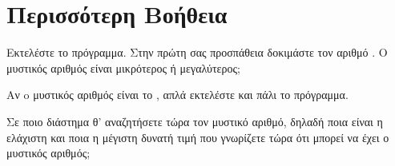 \documentclass[a4paper,11pt,oneside]{book}
\begin{document}
\section{Περισσότερη Βοήθεια}

\begin{step}
Εκτελέστε το πρόγραμμα. Στην πρώτη σας προσπάθεια δοκιμάστε τον αριθμό . Ο μυστικός αριθμός είναι μικρότερος ή μεγαλύτερος;

\begin{note}
Αν o μυστικός αριθμός είναι το , απλά εκτελέστε και πάλι το πρόγραμμα.
\end{note}

\marginnote[14pt]{\icondiscuss}
\dottedline

Σε ποιο διάστημα θ' αναζητήσετε τώρα τον μυστικό αριθμό, δηλαδή 
ποια είναι η ελάχιστη και ποια η μέγιστη δυνατή τιμή που γνωρίζετε τώρα ότι μπορεί να έχει ο μυστικός αριθμός;

\marginnote[14pt]{\icondiscuss}
\dottedline
\end{step}
\end{document}
